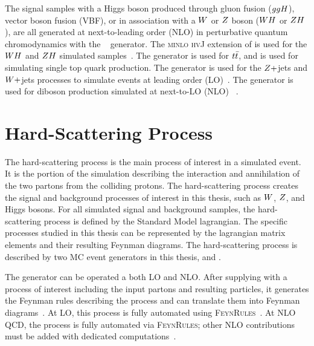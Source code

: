 The signal samples with a Higgs boson produced through gluon fusion ($ggH$), vector boson fusion (VBF),
or in association with a $W$ or $Z$ boson ($WH$ or $ZH$), are all
generated at next-to-leading order (NLO) in perturbative quantum chromodynamics 
with the ~\cite{Nason:2004rx,Frixione:2007vw, Alioli:2010xa, Alioli:2008tz} 
generator. The \textsc{minlo hvJ} extension of  
is used for the $WH$ and $ZH$ simulated samples~\cite{Luisoni:2013kna}. 
The  generator is used for $t\bar{t}$, and  is used for simulating 
single top quark production.
The \MGAMCNLO generator is used for the $Z+$jets and $W+$jets 
processes to simulate events at leading order (LO)~\cite{Alwall:2007fs}.
The \MGAMCNLO generator is used for diboson production simulated at next-to-LO (NLO) 
~\cite{Frederix:2012ps}.



\section{Hard-Scattering Process}
The hard-scattering process is the main process of interest in a simulated event.
It is the portion of the simulation describing the interaction and annihilation of the
two partons from the colliding protons. The hard-scattering process creates the 
signal and background processes of interest in this thesis,
such as $W$, $Z$, and Higgs bosons. For all simulated signal and background samples,
the hard-scattering process is defined by the Standard Model lagrangian. The specific processes
studied in this thesis can be represented by the lagrangian matrix elements and their
resulting Feynman diagrams. The hard-scattering process is described by two
MC event generators in this thesis, \MGAMCNLO and \POWHEG. 

The \MGAMCNLO generator can be
operated a both LO and NLO. After supplying \MGAMCNLO with a process of interest including
the input partons and resulting particles, it generates the Feynman rules describing the 
process and can translate them into Feynman diagrams~\cite{Christensen:2008py}. 
At LO, this process is fully automated using \textsc{FeynRules}~\cite{Christensen:2008py,Alloul:2013bka}.
At NLO QCD, the process is fully automated via \textsc{FeynRules}; other NLO contributions 
must be added with dedicated computations~\cite{Alwall:2014hca}.

